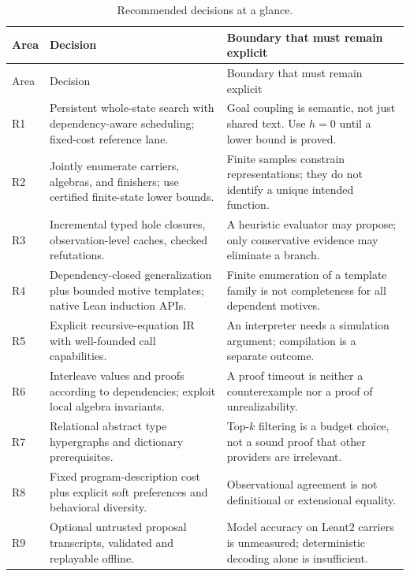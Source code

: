 \begin{longtable}{@{}L{9mm}L{62mm}L{80mm}@{}}
\caption{Recommended decisions at a glance.}\label{tab:decisions}\\
\toprule Area & Decision & Boundary that must remain explicit\\\midrule\endfirsthead
\toprule Area & Decision & Boundary that must remain explicit\\\midrule\endhead
R1 & Persistent whole-state search with dependency-aware scheduling; fixed-cost reference lane. & Goal coupling is semantic, not just shared text. Use $h=0$ until a lower bound is proved.\\
R2 & Jointly enumerate carriers, algebras, and finishers; use certified finite-state lower bounds. & Finite samples constrain representations; they do not identify a unique intended function.\\
R3 & Incremental typed hole closures, observation-level caches, checked refutations. & A heuristic evaluator may propose; only conservative evidence may eliminate a branch.\\
R4 & Dependency-closed generalization plus bounded motive templates; native Lean induction APIs. & Finite enumeration of a template family is not completeness for all dependent motives.\\
R5 & Explicit recursive-equation IR with well-founded call capabilities. & An interpreter needs a simulation argument; compilation is a separate outcome.\\
R6 & Interleave values and proofs according to dependencies; exploit local algebra invariants. & A proof timeout is neither a counterexample nor a proof of unrealizability.\\
R7 & Relational abstract type hypergraphs and dictionary prerequisites. & Top-$k$ filtering is a budget choice, not a sound proof that other providers are irrelevant.\\
R8 & Fixed program-description cost plus explicit soft preferences and behavioral diversity. & Observational agreement is not definitional or extensional equality.\\
R9 & Optional untrusted proposal transcripts, validated and replayable offline. & Model accuracy on Leant2 carriers is unmeasured; deterministic decoding alone is insufficient.\\
\bottomrule
\end{longtable}
